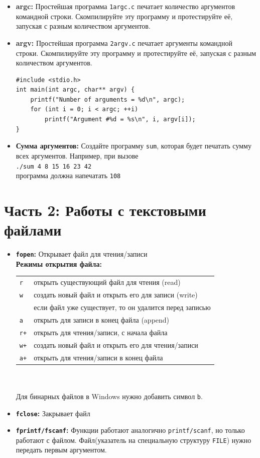 \documentclass{article}
\begin{document}
\begin{itemize}
\item \textbf{argc:} Простейшая программа \texttt{1argc.c} печатает количество аргументов командной строки. Скомпилируйте эту программу и протестируйте её, запуская с разным количеством аргументов.
\item \textbf{argv:} Простейшая программа \texttt{2argv.c} печатает аргументы командной строки. Скомпилируйте эту программу и протестируйте её, запуская с разным количеством аргументов.
\begin{lstlisting}
#include <stdio.h>
int main(int argc, char** argv) {
    printf("Number of arguments = %d\n", argc);
    for (int i = 0; i < argc; ++i)
        printf("Argument #%d = %s\n", i, argv[i]);
}
\end{lstlisting}
\item \textbf{Сумма аргументов:} Создайте программу \texttt{sum}, которая будет печатать сумму всех аргументов. Например, при вызове \\
\texttt{./sum 4 8 15 16 23 42}\\
программа должна напечатать \texttt{108}
\end{itemize}

\newpage
\section*{Часть 2: Работы с текстовыми файлами}
\begin{itemize}
\item \textbf{\texttt{fopen}:} Открывает файл для чтения/записи\\
\textbf{Режимы открытия файла:} \\
\begin{tabular}{ | l || l |}
\hline
  \texttt{r} & открыть существующий файл для чтения (read)\\
  \texttt{w} & создать новый файл и открыть его для записи (write)\\
    & если файл уже существует, то он удалится перед записью\\
  \texttt{a} & открыть для записи в конец файла (append)\\
  \texttt{r+} & открыть для чтения/записи, с начала файла  \\
  \texttt{w+} & создать новый файл и открыть его для чтения/записи \\
  \texttt{a+} & открыть для чтения/записи в конец файла \\
\hline
\end{tabular}\\\\
Для бинарных файлов в Windows нужно добавить символ \texttt{b}.
\item \textbf{\texttt{fclose}:} Закрывает файл
\item \textbf{\texttt{fprintf/fscanf}:} Функции работают аналогично \texttt{printf/scanf}, но только работают с файлом. Файл(указатель на специальную структуру \texttt{FILE}) нужно передать первым аргументом.
\end{itemize}
\end{document}
